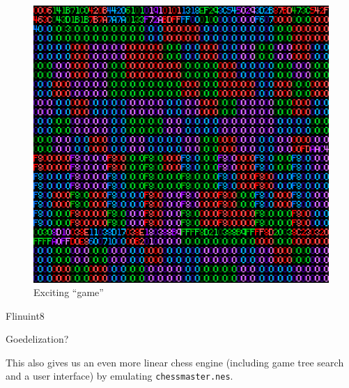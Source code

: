 \documentclass[twocolumn]{article}
\begin{document}
\begin{figure}[htp]
  \includegraphics[width=0.9 \linewidth]{testrom}
  \caption{
    Exciting ``game''
  } \label{fig:testrom}
\end{figure}

Flinuint8

Goedelization?

This also gives us an even more linear chess engine (including
game tree search and a user interface) by emulating {\tt chessmaster.nes}.
\end{document}

